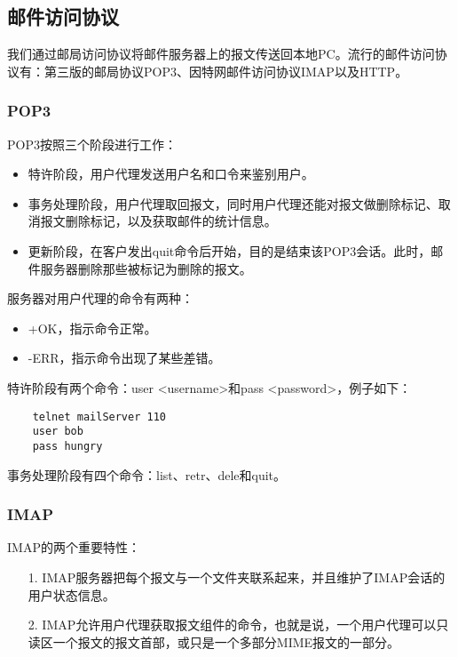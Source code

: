 \documentclass[a4paper,left=2.5cm,right=2.5cm,11pt]{article}
\begin{document}
\subsection{邮件访问协议}
	我们通过邮局访问协议将邮件服务器上的报文传送回本地PC。流行的邮件访问协议有：第三版的邮局协议POP3、因特网邮件访问协议IMAP以及HTTP。

\subsubsection{POP3}
	POP3按照三个阶段进行工作：
	\begin{itemize}
		\item 特许阶段，用户代理发送用户名和口令来鉴别用户。
		\item 事务处理阶段，用户代理取回报文，同时用户代理还能对报文做删除标记、取消报文删除标记，以及获取邮件的统计信息。
		\item 更新阶段，在客户发出quit命令后开始，目的是结束该POP3会话。此时，邮件服务器删除那些被标记为删除的报文。
	\end{itemize}

	服务器对用户代理的命令有两种：
	\begin{itemize}
		\item +OK，指示命令正常。
		\item -ERR，指示命令出现了某些差错。
	\end{itemize}

	特许阶段有两个命令：user <username>和pass <password>，例子如下：
	\begin{lstlisting}
	telnet mailServer 110
	user bob
	pass hungry
	\end{lstlisting}

	事务处理阶段有四个命令：list、retr、dele和quit。

\subsubsection{IMAP}
	IMAP的两个重要特性：
	\begin{itemize}
		\item[1.] IMAP服务器把每个报文与一个文件夹联系起来，并且维护了IMAP会话的用户状态信息。
		\item[2.] IMAP允许用户代理获取报文组件的命令，也就是说，一个用户代理可以只读区一个报文的报文首部，或只是一个多部分MIME报文的一部分。
	\end{itemize}
\end{document}
